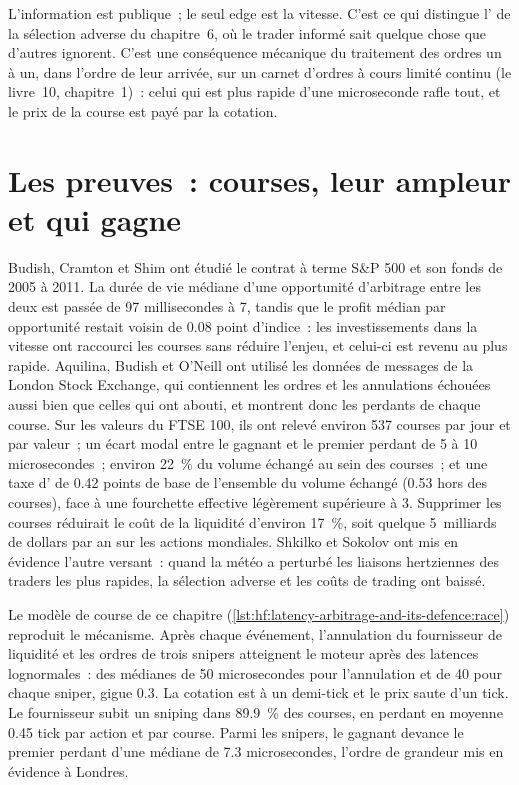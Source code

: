 L'information est publique~; le seul edge est la vitesse. C'est ce qui distingue l' de la sélection adverse du chapitre~6, où le
trader informé sait quelque chose que d'autres ignorent. C'est une conséquence mécanique du traitement des ordres un à un, dans l'ordre de leur arrivée, sur un
carnet d'ordres à cours limité continu (le livre~10, chapitre~1)~: celui qui est plus rapide d'une microseconde rafle tout, et le prix de la course est payé par
la cotation.

\section{Les preuves~: courses, leur ampleur et qui gagne}

Budish, Cramton et Shim ont étudié le contrat à terme S\&P 500 et son fonds de 2005 à 2011. La durée de vie médiane d'une opportunité d'arbitrage entre les deux est passée de
97 millisecondes à 7, tandis que le profit médian par opportunité restait voisin de 0.08 point d'indice~: les investissements dans la vitesse ont raccourci les courses sans réduire
l'enjeu, et celui-ci est revenu au plus rapide. Aquilina, Budish et O'Neill ont utilisé les données de messages de la London Stock Exchange, qui contiennent les ordres et
les annulations échouées aussi bien que celles qui ont abouti, et montrent donc les perdants de chaque course. Sur les valeurs du FTSE 100, ils ont relevé environ 537 courses par jour et par
valeur~; un écart modal entre le gagnant et le premier perdant de 5 à 10 microsecondes~; environ 22~\% du volume échangé au sein des courses~; et une taxe d' de
0.42 points de base de l'ensemble du volume échangé (0.53 hors des courses), face à une fourchette effective légèrement supérieure à 3. Supprimer les courses réduirait
le coût de la liquidité d'environ 17~\%, soit quelque 5~milliards de dollars par an sur les actions mondiales. Shkilko et Sokolov ont mis en évidence l'autre versant~: quand la météo a perturbé les
liaisons hertziennes des traders les plus rapides, la sélection adverse et les coûts de trading ont baissé.

Le modèle de course de ce chapitre (\cref{lst:hf:latency-arbitrage-and-its-defence:race}) reproduit le mécanisme. Après chaque événement, l'annulation du fournisseur de liquidité
et les ordres de trois snipers atteignent le moteur après des latences lognormales~: des médianes de 50 microsecondes pour l'annulation et de 40 pour chaque sniper,
gigue 0.3. La cotation est à un demi-tick et le prix saute d'un tick. Le fournisseur subit un sniping dans 89.9~\% des courses, en perdant
en moyenne 0.45 tick par action et par course. Parmi les snipers, le gagnant devance le premier perdant d'une médiane de 7.3 microsecondes, l'ordre de grandeur mis en évidence à Londres.


